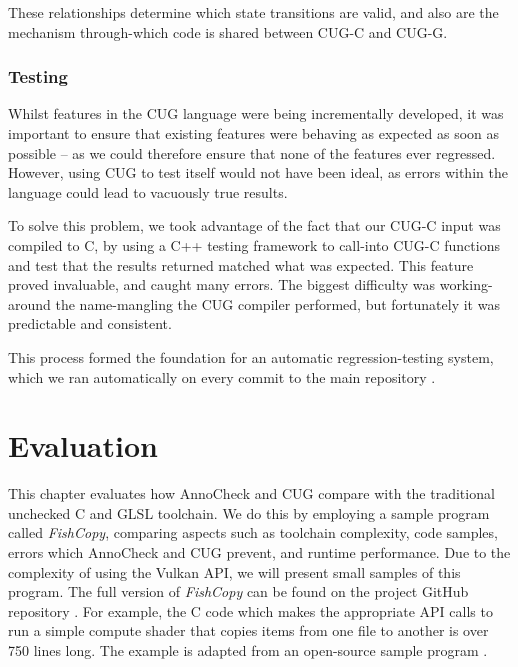\documentclass[a4paper,12pt,twoside,openright]{report}
\begin{document}
These relationships determine which state transitions are valid, and also are
the mechanism through-which code is shared between CUG-C and CUG-G.

\subsection{Testing}

\label{sec:testing}

Whilst features in the CUG language were being incrementally developed, it was
important to ensure that existing features were behaving as expected as soon as
possible -- as we could therefore ensure that none of the features ever
regressed. However, using CUG to test itself would not have been ideal, as
errors within the language could lead to vacuously true results.

To solve this problem, we took advantage of the fact that our CUG-C input was
compiled to C, by using a C++ testing framework to call-into CUG-C functions
and test that the results returned matched what was expected. This feature
proved invaluable, and caught many errors. The biggest difficulty was
working-around the name-mangling the CUG compiler performed, but fortunately it
was predictable and consistent.

This process formed the foundation for an automatic regression-testing system,
which we ran automatically on every commit to the main repository
\cite{ProjectSource} \cite{AutomatedTestCode} \cite{AutomatedTestOutput}.

\chapter{Evaluation}

\label{chp:evaluation}

This chapter evaluates how AnnoCheck and CUG compare with the traditional
unchecked C and GLSL toolchain. We do this by employing a sample program called
\textit{FishCopy}, comparing aspects such as toolchain complexity, code
samples, errors which AnnoCheck and CUG prevent, and runtime performance. Due
to the complexity of using the Vulkan API, we will present small samples of
this program. The full version of \textit{FishCopy} can be found on the project
GitHub repository \cite{ProjectSource}. For example, the C code which makes the
appropriate API calls to run a simple compute shader that copies items from one
file to another is over 750 lines long. The example is adapted from an
open-source sample program \cite{VulkanComputeExampleSource}.
\end{document}
